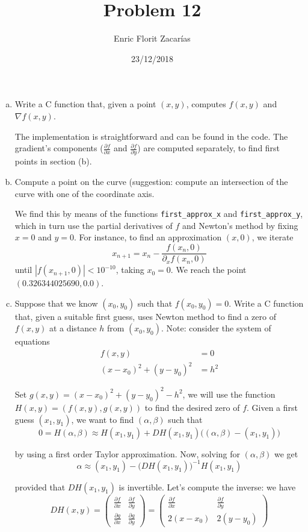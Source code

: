 \documentclass{article}
\begin{document}
\title{Problem 12}
\author{Enric Florit Zacarías}
\date{23/12/2018}

\maketitle

\begin{enumerate}[a)]
\item Write a C function that, given a point $(x,y)$, computes $f(x,y)$ and $\nabla f(x,y)$.

The implementation is straightforward and can be found in the code. The gradient's components ($\frac{\partial f}{\partial x}$ and $\frac{\partial f}{\partial y}$) are computed separately, to find first points in section (b).

\item Compute a point on the curve (suggestion: compute an intersection of the curve with one of the coordinate axis.

We find this by means of the functions \texttt{first\_approx\_x} and \texttt{first\_approx\_y}, which in turn use the partial derivatives of $f$ and Newton's method by fixing $x=0$ and $y=0$. For instance, to find an approximation $(x,0)$, we iterate
$$x_{n+1}=x_n-\frac{f(x_n,0)}{\partial_x f(x_n,0)}$$
until $|f(x_{n+1},0)|<10^{-10}$, taking $x_0=0$. We reach the point $(0.326344025690, 0.0)$.


\item Suppose that we know $(x_0,y_0)$ such that $f(x_0, y_0)=0$. Write a C function that, given a suitable first guess, uses Newton method to find a zero of $f(x,y)$ at a distance $h$ from $(x_0,y_0)$. Note: consider the system of equations
	\begin{align*}
	f(x,y)&=0\\
	(x-x_0)^2 + (y-y_0)^2 &= h^2	
	\end{align*}

Set $g(x,y)=(x-x_0)^2+(y-y_0)^2-h^2$, we will use the function $H(x,y)=(f(x,y),g(x,y))$ to find the desired zero of $f$. Given a first guess $(x_1,y_1)$, we want to find $(\alpha,\beta)$ such that
$$0=H(\alpha,\beta)\approx H(x_1,y_1)+DH(x_1,y_1)\big((\alpha,\beta)-(x_1,y_1)\big)$$

by using a first order Taylor approximation. Now, solving for $(\alpha,\beta)$ we get
$$\alpha\approx (x_1,y_1)-\big(DH(x_1,y_1)\big)^{-1}H(x_1,y_1)$$

provided that $DH(x_1,y_1)$ is invertible. Let's compute the inverse: we have
$$DH(x,y)=\begin{pmatrix}\frac{\partial f}{\partial x} & \frac{\partial f}{\partial y}\\
	\frac{\partial g}{\partial x} & \frac{\partial g}{\partial y}\end{pmatrix}=
	\begin{pmatrix}\frac{\partial f}{\partial x} & \frac{\partial f}{\partial y}\\
	2(x-x_0) & 2(y-y_0)\end{pmatrix}$$
	

\end{enumerate}
\end{document}
